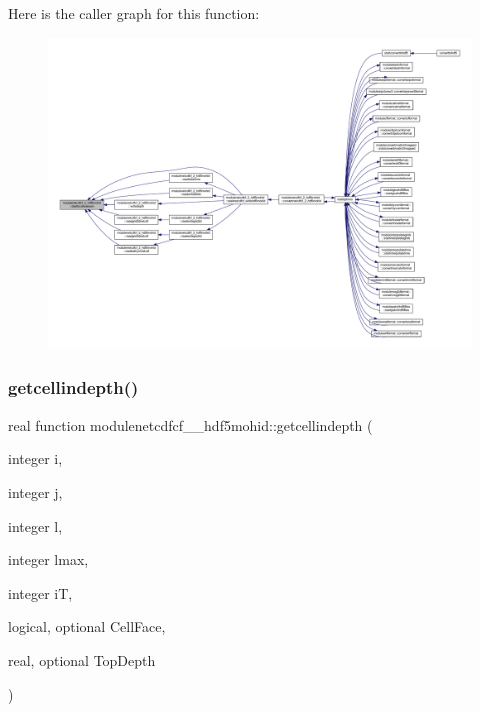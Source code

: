 Here is the caller graph for this function\+:\nopagebreak
\begin{figure}[H]
\begin{center}
\leavevmode
\includegraphics[width=350pt]{namespacemodulenetcdfcf__2__hdf5mohid_a270019f12c3ed995eab2d0a7dcb103cc_icgraph}
\end{center}
\end{figure}
\mbox{\label{namespacemodulenetcdfcf__2__hdf5mohid_ac801b4c359021fc9e8880497aa5fc5d6}} 
\subsubsection{\texorpdfstring{getcellindepth()}{getcellindepth()}}
{\footnotesize\ttfamily real function modulenetcdfcf\+\_\+\_\+hdf5mohid\+::getcellindepth (\begin{DoxyParamCaption}\item[{integer}]{i,  }\item[{integer}]{j,  }\item[{integer}]{l,  }\item[{integer}]{lmax,  }\item[{integer}]{iT,  }\item[{logical, optional}]{Cell\+Face,  }\item[{real, optional}]{Top\+Depth }\end{DoxyParamCaption})\hspace{0.3cm}{\ttfamily [private]}}


